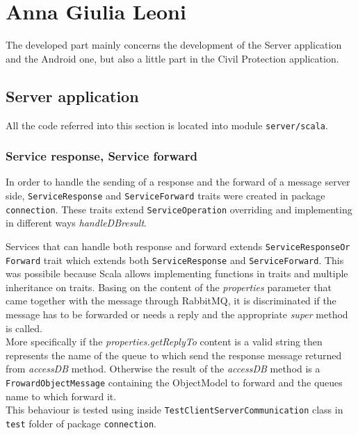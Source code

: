 \documentclass[a4paper,12pt]{report}
\begin{document}
\section{Anna Giulia Leoni}

The developed part mainly concerns the development of the Server application and the Android one, but also  a little part in the Civil Protection application.

\subsection{Server application}

All the code referred into this section is located into module \texttt{server/scala}.

\subsubsection{Service response, Service forward}
In order to handle the sending of a response and the forward of a message server side, \texttt{ServiceResponse} and \texttt{ServiceForward} traits were created in package \texttt{connection}. These traits extend \texttt{ServiceOperation} overriding and implementing in different ways \textit{handleDBresult}. 

Services that can handle both response and forward extends \texttt{ServiceResponseOr\\Forward} trait which extends both \texttt{ServiceResponse} and \texttt{ServiceForward}. This was possibile because Scala allows implementing functions in traits and multiple inheritance on traits. Basing on the content of the \textit{properties} parameter that came together with the message through RabbitMQ, it is discriminated if the message has to be forwarded or needs a reply and the appropriate \textit{super} method is called.
\\More specifically if the \textit{properties.getReplyTo} content is a valid string then represents the name of the queue to which send the response message returned from \textit{accessDB} method. Otherwise the result of the \textit{accessDB} method is a \texttt{FrowardObjectMessage} containing the ObjectModel to forward and the queues name to which forward it.
\\This behaviour is tested using inside \texttt{TestClientServerCommunication} class in \texttt{test} folder of package \texttt{connection}.
\\
\end{document}
